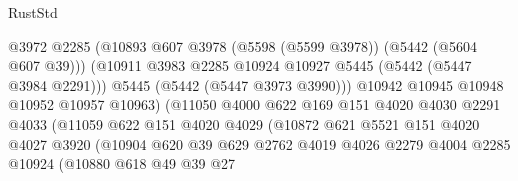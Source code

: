 \begin{lexlean}{RustStd}
\begin{coremodule}
                                    @3972
                                    @2285
                                    (@10893
                                      @607
                                      @3978
                                      (@5598 (@5599 @3978))
                                      (@5442 (@5604 @607 @39)))
                                    (@10911
                                      @3983
                                      @2285
                                      @10924
                                      @10927
                                      @5445
                                      (@5442 (@5447 @3984 @2291)))
                                    @5445
                                    (@5442 (@5447 @3973 @3990)))
                                  @10942
                                  @10945
                                  @10948
                                  @10952
                                  @10957
                                  @10963)
                                (@11050
                                  @4000
                                  @622
                                  @169
                                  @151
                                  @4020
                                  @4030
                                  @2291
                                  @4033
                                  (@11059
                                    @622
                                    @151
                                    @4020
                                    @4029
                                    (@10872
                                      @621
                                      @5521
                                      @151
                                      @4020
                                      @4027
                                      @3920
                                      (@10904
                                        @620
                                        @39
                                        @629
                                        @2762
                                        @4019
                                        @4026
                                        @2279
                                        @4004
                                        @2285
                                        @10924
                                        (@10880
                                          @618
                                          @49
                                          @39
                                          @27

\end{coremodule}
\end{lexlean}
